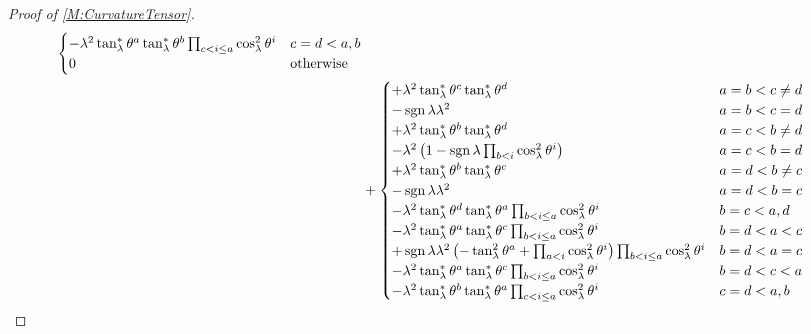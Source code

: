 \documentclass[../methodology.tex]{subfiles}
\begin{document}
\begin{proof}[Proof of \cref{M:CurvatureTensor}]
\begin{align*}
\begin{cases}
      -\lambda^2\tan_\lambda^\ast\tensor{\theta}{^a}\tan_\lambda^\ast\tensor{\theta}{^b}\prod_{c<i\le a}\cos_\lambda^2\tensor{\theta}{^i}
        & \text{\(c=d<a,b\)}    \\
      0 & \text{otherwise}      \\
    \end{cases}                                                \\
     & +\begin{cases}
          +\lambda^2\tan_\lambda^\ast\tensor{\theta}{^c}\tan_\lambda^\ast\tensor{\theta}{^d}
            & \text{\(a=b<c\ne d\)} \\
          -\sign{\lambda}\lambda^2
            & \text{\(a=b<c=d\)}    \\
          +\lambda^2\tan_\lambda^\ast\tensor{\theta}{^b}\tan_\lambda^\ast\tensor{\theta}{^d}
            & \text{\(a=c<b\ne d\)} \\
          -\lambda^2
          \left(
          1
          -\sign{\lambda}\prod_{b<i}\cos_\lambda^2\tensor{\theta}{^i}
          \right)
            & \text{\(a=c<b=d\)}    \\
          +\lambda^2\tan_\lambda^\ast\tensor{\theta}{^b}\tan_\lambda^\ast\tensor{\theta}{^c}
            & \text{\(a=d<b\ne c\)} \\
          -\sign{\lambda}\lambda^2
            & \text{\(a=d<b=c\)}    \\
          -\lambda^2\tan_\lambda^\ast\tensor{\theta}{^d}\tan_\lambda^\ast\tensor{\theta}{^a}\prod_{b<i\le a}\cos_\lambda^2\tensor{\theta}{^i}
            & \text{\(b=c<a,d\)}    \\
          -\lambda^2\tan_\lambda^\ast\tensor{\theta}{^a}\tan_\lambda^\ast\tensor{\theta}{^c}\prod_{b<i\le a}\cos_\lambda^2\tensor{\theta}{^i}
            & \text{\(b=d<a<c\)}    \\
          +\sign{\lambda}\lambda^2
          \left(
          -\tan_\lambda^2\tensor{\theta}{^a}
          +\prod_{a<i}\cos_\lambda^2\tensor{\theta}{^i}
          \right)
          \prod_{b<i\le a}\cos_\lambda^2\tensor{\theta}{^i}
            & \text{\(b=d<a=c\)}    \\
          -\lambda^2\tan_\lambda^\ast\tensor{\theta}{^a}\tan_\lambda^\ast\tensor{\theta}{^c}\prod_{b<i\le a}{\cos_\lambda^2\tensor{\theta}{^i}}
            & \text{\(b=d<c<a\)}    \\
          -\lambda^2\tan_\lambda^\ast\tensor{\theta}{^b}\tan_\lambda^\ast\tensor{\theta}{^a}\prod_{c<i\le a}\cos_\lambda^2\tensor{\theta}{^i}
            & \text{\(c=d<a,b\)}    \\

\end{cases}
\end{align*}
\end{proof}
\end{document}
